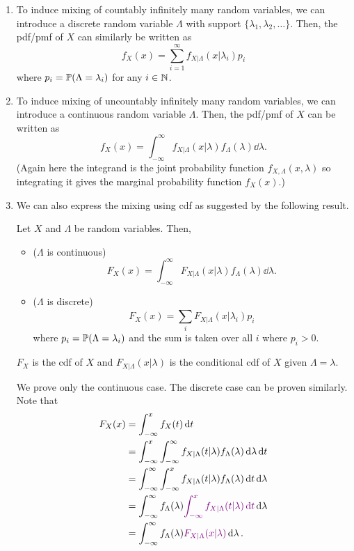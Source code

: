 \begin{enumerate}
\item \label{it:mixing-count-infinite}
To induce mixing of countably infinitely many random variables, we can
introduce a discrete random variable \(\Lambda\) with support
\(\{\lambda_1,\lambda_2,\dotsc\}\). Then, the pdf/pmf of \(X\) can similarly be
written as
\[
f_X(x)=\boxed{\sum_{i=1}^{\infty}f_{X|\Lambda}(x|\lambda_i)p_i}
\]
where \(p_i=\mathbb{P}\qty(\Lambda=\lambda_i)\) for any \(i\in\mathbb{N}\).

\item \label{it:mixing-uncount-infinite}
To induce mixing of uncountably infinitely many random variables, we can
introduce a continuous random variable \(\Lambda\). Then, the pdf/pmf of \(X\)
can be written as
\[
f_X(x)=\boxed{\int_{-\infty}^{\infty}f_{X|\Lambda}(x|\lambda)f_{\Lambda}(\lambda)\dd{\lambda}}.
\]
(Again here the integrand is the joint probability function
\(f_{X,\Lambda}(x,\lambda)\) so integrating it gives the marginal probability
function \(f_X(x)\).)

\item We can also express the mixing using cdf as suggested by the following
result.
\begin{proposition}
\label{prp:mixing-cdf}
Let \(X\) and \(\Lambda\) be random variables. Then,
\begin{itemize}
\item (\(\Lambda\) is continuous)
\[
F_X(x)=\int_{-\infty}^{\infty}F_{X|\Lambda}(x|\lambda)f_{\Lambda}(\lambda)\dd{\lambda}.
\]
\item (\(\Lambda\) is discrete)
\[
F_X(x)=\sum_{i}^{}F_{X|\Lambda}(x|\lambda_i)p_i
\]
where \(p_i=\mathbb{P}\qty(\Lambda=\lambda_i)\) and the sum is taken over all \(i\)
where \(p_i>0\).
\end{itemize}
\begin{note}
\(F_X\) is the cdf of \(X\) and \(F_{X|\Lambda}(x|\lambda)\) is the conditional
cdf of \(X\) given \(\Lambda=\lambda\).
\end{note}
\end{proposition}
\begin{pf}
We prove only the continuous case. The discrete case can be proven similarly.
Note that
\begin{align*}
F_X(x)&=\int_{-\infty}^{x}f_X(t)\dd{t}\\
&=\int_{-\infty}^{x}\int_{-\infty}^{\infty}
f_{X|\Lambda}(t|\lambda)f_{\Lambda}(\lambda)\dd{\lambda}\dd{t}\\
&=\int_{-\infty}^{\infty}\int_{-\infty}^{x}
f_{X|\Lambda}(t|\lambda)f_{\Lambda}(\lambda)\dd{t}\dd{\lambda}\\
&=\int_{-\infty}^{\infty}f_{\Lambda}(\lambda){\color{violet}\int_{-\infty}^{x}
f_{X|\Lambda}(t|\lambda)\dd{t}}\dd{\lambda}\\
&=\int_{-\infty}^{\infty}f_{\Lambda}(\lambda){\color{violet}F_{X|\Lambda}(x|\lambda)}\dd{\lambda}.
\end{align*}

\end{pf}
\end{enumerate}
